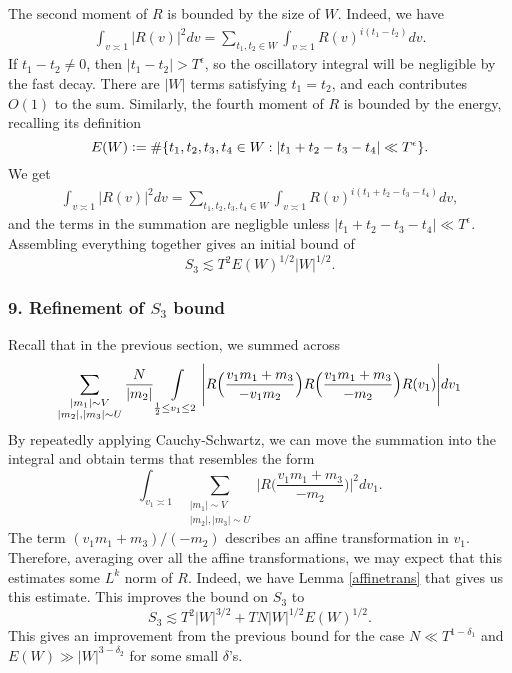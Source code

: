 The second moment of $R$ is bounded by the size of $W$. Indeed, we have \begin{align*}
    \int_{v\asymp 1} |R(v)|^2 dv =  \sum_{t_1,t_2\in W} \int_{v\asymp 1} R(v)^{i(t_1-t_2)} dv.  
\end{align*}
If $t_1-t_2\neq 0$, then $|t_1-t_2|>T^\epsilon$, so the oscillatory integral will be negligible by the fast decay. There are $|W|$ terms satisfying $t_1=t_2$, and each contributes $O(1)$ to the sum. Similarly, the fourth moment of $R$ is bounded by the energy, recalling its definition \[
    E(W)\mathrel{\mathop:}= \#\{t_1,t_2,t_3,t_4\in W : |t_1+t_2-t_3-t_4|\ll T^\epsilon\}.
\]
We get
\begin{align*}
    \int_{v\asymp 1} |R(v)|^2 dv =   \sum_{t_1,t_2,t_3,t_4\in W} \int_{v\asymp 1}  R(v)^{i(t_1+t_2-t_3-t_4)} dv, 
\end{align*}
and the terms in the summation are negligble unless $|t_1+t_2-t_3-t_4|\ll T^\epsilon$. Assembling everything together gives an initial bound of \[
S_3\lesssim T^2E(W)^{1/2}|W|^{1/2}.
\]


\subsubsection*{9. Refinement of $S_3$ bound}

Recall that in the previous section, we summed across 
\[
    \sum_{\substack{|m_1|\sim V\\ |m_2|, |m_3|\sim U}} \frac{N}{|m_2|} \int\displaylimits_{\substack{
        \frac{1}{2}\leq v_1\leq 2
    }} \Bigg|R\Big(\frac{v_1m_1+m_3}{-v_1m_2}\Big) R\Big(\frac{v_1m_1+m_3}{-m_2}\Big) R({v_1})\Bigg| dv_1
\]
By repeatedly applying Cauchy-Schwartz, we can move the summation into the integral and obtain terms that resembles the form \[
   \int_{v_1\asymp 1} \sum_{\substack{|m_1|\sim V\\ |m_2|, |m_3|\sim U}}  \Big| R\Big(\frac{v_1m_1+m_3}{-m_2}\Big)\Big|^2 dv_1.
\]
The term $(v_1m_1+m_3)/(-m_2)$ describes an affine transformation in $v_1$. Therefore, averaging over all the affine transformations, we may expect that this estimates some $L^k$ norm of $R$. Indeed, we have Lemma \ref{affinetrans} that gives us this estimate. This improves the bound on $S_3$ to\[
S_3\lesssim T^2|W|^{3/2}+TN|W|^{1/2}E(W)^{1/2}.
\]
This gives an improvement from the previous bound for the case $N \ll T^{1-\delta_1}$ and $E(W)\gg |W|^{3-\delta_2}$ for some small $\delta$'s.


